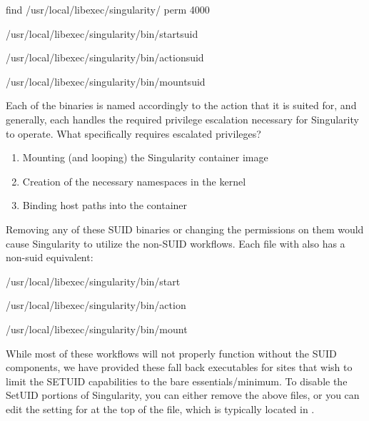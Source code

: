 \documentclass[letterpaper,10pt,english]{sphinxmanual}
\begin{document}
%
\begin{sphinxVerbatim}[commandchars=\\\{\}]
\PYGZdl{} find /usr/local/libexec/singularity/ \PYGZhy{}perm \PYGZhy{}4000

/usr/local/libexec/singularity/bin/start\PYGZhy{}suid

/usr/local/libexec/singularity/bin/action\PYGZhy{}suid

/usr/local/libexec/singularity/bin/mount\PYGZhy{}suid
\end{sphinxVerbatim}

Each of the binaries is named accordingly to the action that it is
suited for, and generally, each handles the required privilege
escalation necessary for Singularity to operate. What specifically
requires escalated privileges?
\begin{enumerate}
\item {} 
Mounting (and looping) the Singularity container image

\item {} 
Creation of the necessary namespaces in the kernel

\item {} 
Binding host paths into the container

\end{enumerate}

Removing any of these SUID binaries or changing the permissions on them
would cause Singularity to utilize the non-SUID workflows. Each file
with  also has a non-suid equivalent:

%
\begin{sphinxVerbatim}[commandchars=\\\{\}]
/usr/local/libexec/singularity/bin/start

/usr/local/libexec/singularity/bin/action

/usr/local/libexec/singularity/bin/mount
\end{sphinxVerbatim}

While most of these workflows will not properly function without the
SUID components, we have provided these fall back executables for
sites that wish to limit the SETUID capabilities to the bare
essentials/minimum. To disable the SetUID portions of Singularity, you
can either remove the above  files, or you can edit the setting for  at
the top of the  file, which is typically located in .
\end{document}
